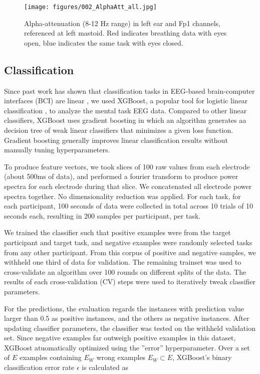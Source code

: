 \documentclass{sigchi}
\begin{document}
\begin{figure}[h]
\centering
\texttt{[image: figures/002\_AlphaAtt\_all.jpg]}
\caption{Alpha-attenuation (8-12 Hz range) in left ear and Fp1 channels, referenced at left mastoid. Red indicates breathing data with eyes open, blue indicates the same task with eyes closed.}
\label{fig:alpha_atten}
\end{figure}

\subsection{Classification}

Since past work has shown that classification tasks in EEG-based brain-computer interfaces (BCI) are linear \cite{Garrett2003a}, we used XGBoost, a popular tool for logistic linear classification \cite{Chen2016}, to analyze the mental task EEG data. Compared to other linear classifiers, XGBoost uses gradient boosting in which an algorithm generates aa decision tree of weak linear classifiers that minimizes a given loss function. Gradient boosting generally improves linear classification results without manually tuning hyperparameters.

To produce feature vectors, we took slices of 100 raw values from each electrode (about 500ms of data), and performed a fourier transform to produce power spectra for each electrode during that slice. We concatenated all electrode power spectra together. No dimensionality reduction was applied. For each task, for each participant, 100 seconds of data were collected in total across 10 trials of 10 seconds each, resulting in 200 samples per participant, per task.

We trained the classifier such that positive examples were from the target participant and target task, and negative examples were randomly selected tasks from any other participant. From this corpus of positive and negative samples, we withheld one third of data for validation. The remaining trainset was used to cross-validate an algorithm over 100 rounds on different splits of the data. The results of each cross-validation (CV) steps were used to iteratively tweak classifier parameters. 

For the predictions, the evaluation regards the instances with prediction value larger than 0.5 as positive instances, and the others as negative instances. After updating classifier parameters, the classifier was tested on the withheld validation set. Since negative examples far outweigh positive examples in this dataset, XGBoost atuomatically optimized using the ”error” hyperparameter. Over a set of \(E\) examples containing \(E_W\) wrong examples \(E_W\subset{E}\), XGBoost's binary classification error rate \(\epsilon\) is calculated as
\end{document}
